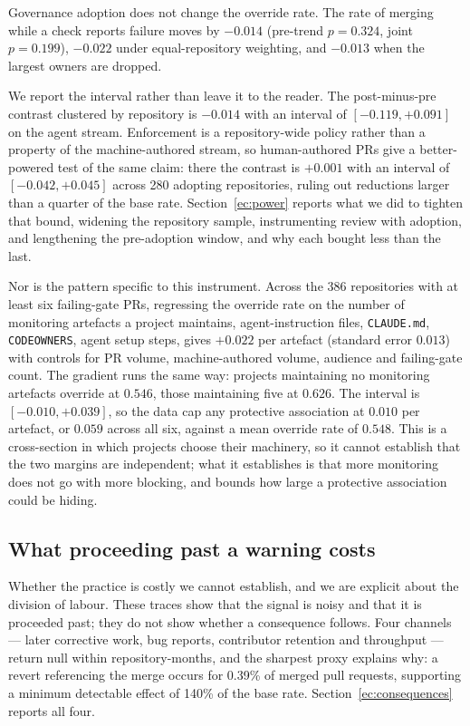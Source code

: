\documentclass[mnsc]{informs4}
\begin{document}
Governance adoption does not change the override rate. The rate of merging while a check reports
failure moves by $-0.014$ (pre-trend $p=0.324$, joint $p=0.199$), $-0.022$
under equal-repository weighting, and $-0.013$ when the largest owners are dropped.

We report the interval rather than leave it to the reader. The post-minus-pre
contrast clustered by repository is $-0.014$ with an interval of $[-0.119, +0.091]$
on the agent stream. Enforcement is a repository-wide policy rather than a property
of the machine-authored stream, so human-authored PRs give a better-powered test of
the same claim: there the contrast is $+0.001$ with an interval of
$[-0.042, +0.045]$ across 280 adopting repositories, ruling out reductions larger
than a quarter of the base rate. Section~\ref{ec:power} reports what we did to
tighten that bound, widening the repository sample, instrumenting review with
adoption, and lengthening the pre-adoption window, and why each bought less than
the last.

Nor is the pattern specific to this instrument. Across the 386 repositories with at
least six failing-gate PRs, regressing the override rate on the number of
monitoring artefacts a project maintains, agent-instruction files,
\texttt{CLAUDE.md}, \texttt{CODEOWNERS}, agent setup steps, gives $+0.022$ per
artefact (standard error $0.013$) with controls for PR volume, machine-authored
volume, audience and failing-gate count. The gradient runs the same way: projects
maintaining no monitoring artefacts override at $0.546$, those maintaining five at
$0.626$. The interval is $[-0.010, +0.039]$, so the data cap any protective
association at $0.010$ per artefact, or $0.059$ across all six, against a mean
override rate of $0.548$. This is a cross-section in which projects choose their
machinery, so it cannot establish that the two margins are independent; what it
establishes is that more monitoring does not go with more blocking, and bounds how
large a protective association could be hiding.

\subsection{What proceeding past a warning costs}

Whether the practice is costly we cannot establish, and we are explicit about the
division of labour. These traces show that the signal is noisy and that it is
proceeded past; they do not show whether a consequence follows. Four channels ---
later corrective work, bug reports, contributor retention and throughput --- return
null within repository-months, and the sharpest proxy explains why: a revert
referencing the merge occurs for 0.39\% of merged pull requests, supporting a
minimum detectable effect of 140\% of the base rate. Section~\ref{ec:consequences}
reports all four.
\end{document}
